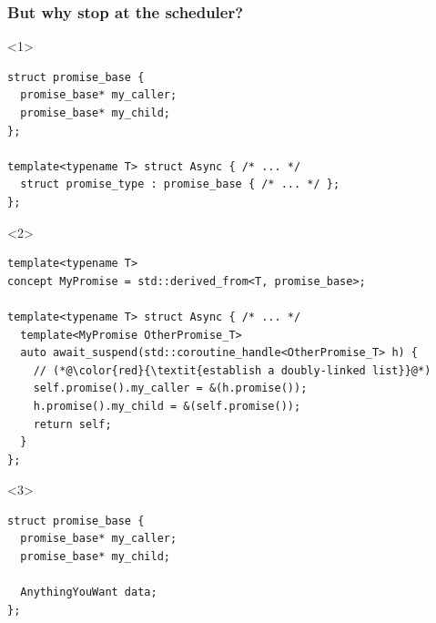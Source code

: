 \documentclass[aspectratio=169]{beamer}
\begin{document}
\begin{frame}[fragile]
  \frametitle{But why stop at the scheduler?}
  
  \begin{onlyenv}<1>
  \begin{lstlisting}[style=cpp20]
struct promise_base {
  promise_base* my_caller;
  promise_base* my_child;
};

template<typename T> struct Async { /* ... */
  struct promise_type : promise_base { /* ... */ };
};
  \end{lstlisting}
  \end{onlyenv}
  
  \begin{onlyenv}<2>
  \begin{lstlisting}[style=cpp20]
template<typename T>
concept MyPromise = std::derived_from<T, promise_base>;

template<typename T> struct Async { /* ... */
  template<MyPromise OtherPromise_T>
  auto await_suspend(std::coroutine_handle<OtherPromise_T> h) {
    // (*@\color{red}{\textit{establish a doubly-linked list}}@*)
    self.promise().my_caller = &(h.promise());
    h.promise().my_child = &(self.promise());
    return self;
  }
};
  \end{lstlisting}
  \end{onlyenv}
  
  \begin{onlyenv}<3>
  \begin{lstlisting}[style=cpp20]
struct promise_base {
  promise_base* my_caller;
  promise_base* my_child;
  
  AnythingYouWant data;
};
  \end{lstlisting}
  \end{onlyenv}
\end{frame}
\end{document}
